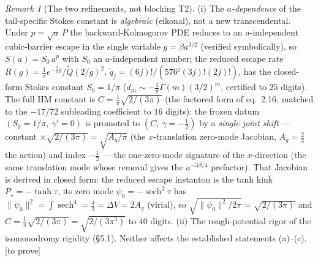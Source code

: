 \documentclass[11pt,reqno]{amsart}
\theoremstyle{plain}
\theoremstyle{definition}
\theoremstyle{remark}
\newtheorem{remark}[theorem]{Remark}
\newcommand{\tagT}{{\footnotesize\textsf{[to prove]}}}
\begin{document}
\begin{remark}[The two refinements, not blocking T2]\label{rem:t2refine}
(i) The \emph{$a$-dependence} of the tail-specific Stokes constant is \emph{algebraic} (eikonal), not
a new transcendental. Under $p=\sqrt a\,P$ the backward-Kolmogorov PDE reduces to an $a$-independent
cubic-barrier escape in the single variable $g=\beta a^{3/2}$ (verified symbolically), so
$S(a)=S_0\,a^{p}$ with $S_0$ an $a$-independent number; the reduced escape rate
$R(g)=\tfrac1\pi e^{-\frac23 g}/\tilde Q(2/g)^2$, $\tilde q_j=(6j)!/(576^j(3j)!(2j)!)$, has the
closed-form Stokes constant $S_0=1/\pi$ ($d_m\sim-\tfrac1\pi\Gamma(m)(3/2)^m$, certified to $25$
digits). The full HM constant is $C=\tfrac1\pi\sqrt{2/(3\pi)}$ (the factored form of \cite{Dunne2025}
eq.~2.16, matched to the $-17/72$ subleading coefficient to $16$ digits): the frozen datum
$(S_0{=}1/\pi,\ \gamma'{=}0)$ is promoted to $(C,\ \gamma{=}-\tfrac12)$ by a \emph{single joint shift}
--- constant $\times\sqrt{2/(3\pi)}=\sqrt{A_g/\pi}$ (the $x$-translation zero-mode Jacobian, $A_g=\tfrac23$
the action) and index $-\tfrac12$ --- the one-zero-mode signature of the $x$-direction (the same
translation mode whose removal gives the $a^{-3\beta/4}$ prefactor). That Jacobian is derived in
closed form: the reduced escape instanton is the tanh kink $P_\star=-\tanh\tau$, its zero mode
$\psi_0=-\operatorname{sech}^2\tau$ has $\lVert\psi_0\rVert^2=\int\operatorname{sech}^4=\tfrac43=\Delta V=2A_g$
(virial), so $\sqrt{\lVert\psi_0\rVert^2/2\pi}=\sqrt{2/(3\pi)}$ and
$C=\tfrac1\pi\sqrt{2/(3\pi)}=\sqrt{2/(3\pi^3)}$ to $40$ digits. (ii) The rough-potential rigor of the isomonodromy rigidity
(\S5.1). Neither affects the established statements (a)--(c). \tagT
\end{remark}
\end{document}
